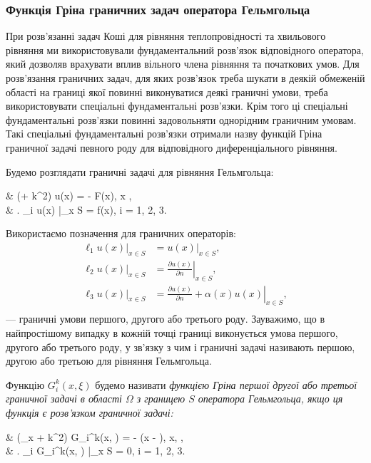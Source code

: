 \subsubsection{Функція Гріна граничних задач оператора Гельмгольца}

При розв'язанні задач Коші для рівняння теплопровідності та хвильового рівняння ми використовували фундаментальний розв'язок відповідного оператора, який дозволяв врахувати вплив вільного члена рівняння та початкових умов. Для розв'язання граничних задач, для яких розв'язок треба шукати в деякій обмеженій області на границі якої повинні виконуватися деякі граничні умови, треба використовувати спеціальні фундаментальні розв'язки. Крім того ці спеціальні фундаментальні розв'язки повинні задовольняти однорідним граничним умовам. Такі спеціальні фундаментальні розв'язки отримали назву функцій Гріна граничної задачі певного роду для відповідного диференціального рівняння. \medskip

\begin{example}
	Будемо розглядати граничні задачі для рівняння Гельмгольца:
	\begin{system}
		& (\Delta + k^2) u(x) = - F(x), \quad x \in \Omega, \\
		& \left. \ell_i u(x) \right|_{x \in S} = f(x), \quad i = 1, 2, 3.
	\end{system}
\end{example}

Використаємо позначення для граничних операторів:
\begin{align}
	\left. \ell_1 u(x) \right|_{x \in S} &= \left. u(x) \right|_{x \in S}, \\
	\left. \ell_2 u(x) \right|_{x \in S} &= \left. \frac{\partial u(x)}{\partial n} \right|_{x \in S}, \\
	\left. \ell_3 u(x) \right|_{x \in S} &= \left. \frac{\partial u(x)}{\partial n} + \alpha(x) u(x) \right|_{x \in S}, \\
\end{align}
--- граничні умови першого, другого або третього роду. Зауважимо, що в найпростішому випадку в кожній точці границі виконується умова першого, другого або третього роду, у зв'язку з чим і граничні задачі називають першою, другою або третьою для рівняння Гельмгольца. \medskip

\begin{definition}
	Функцію $G_i^k(x, \xi)$ будемо називати \it{функцією Гріна} першої другої або третьої граничної задачі в області $\Omega$ з границею $S$ оператора Гельмгольца, якщо ця функція є розв'язком граничної задачі:
	\begin{system}
		& (\Delta_x + k^2) G_i^k(x, \xi) = - \delta(x - \xi), \quad x, \xi \in \Omega, \\
		& \left. \ell_i G_i^k(x, \xi) \right|_{x \in S} = 0, \quad i = 1, 2, 3.
	\end{system}
\end{definition}

